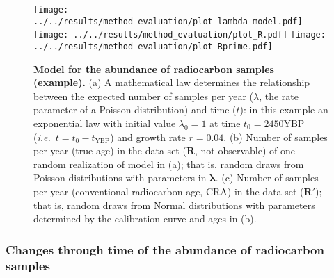 \documentclass[a4paper]{article}
\begin{document}
\begin{figure}[tbhp]
\center\texttt{[image: ../../results/method\_evaluation/plot\_lambda\_model.pdf]} \texttt{[image: ../../results/method\_evaluation/plot\_R.pdf]} \texttt{[image: ../../results/method\_evaluation/plot\_Rprime.pdf]}
\caption[Figure with three panels. Panel "a" shows the values of lambda for every year between 2450 and 2400 BP, following an increasing exponential curve. Panel "b" shows an histogram of the number of samples at each year (simulated from the lambda values in panel "a"); the histogram is somehow ragged but follows a trend of increasing values towards more recent ages. Panel "c" show an histogram of the number of samples at each uncalibrated year (simulated from ages in panel "b"): the histogram is more noisy, the pattern of increase towards more recent ages is difficult to appreciate.]{\textbf{Model for the abundance of radiocarbon samples (example).} (a) A mathematical law determines the relationship between the expected number of samples per year ($\lambda$, the rate parameter of a Poisson distribution) and time ($t$): in this example an exponential law with initial value $\lambda_0=1$ at time $t_0=2450\mathrm{YBP}$ (\emph{i.e.}\ $t=t_0-t_{\mathrm{YBP}}$) and growth rate $r=0.04$. (b) Number of samples per year (true age) in the data set ($\bm{R}$, not observable) of one random realization of model in (a); that is, random draws from Poisson distributions with parameters in $\bm{\lambda}$. (c) Number of samples per year (conventional radiocarbon age, CRA) in the data set ($\bm{R'}$); that is, random draws from Normal distributions with parameters determined by the calibration curve and ages in (b).}
\label{fig:model}
\end{figure}



\subsubsection*{Changes through time of the abundance of radiocarbon samples}
\end{document}
